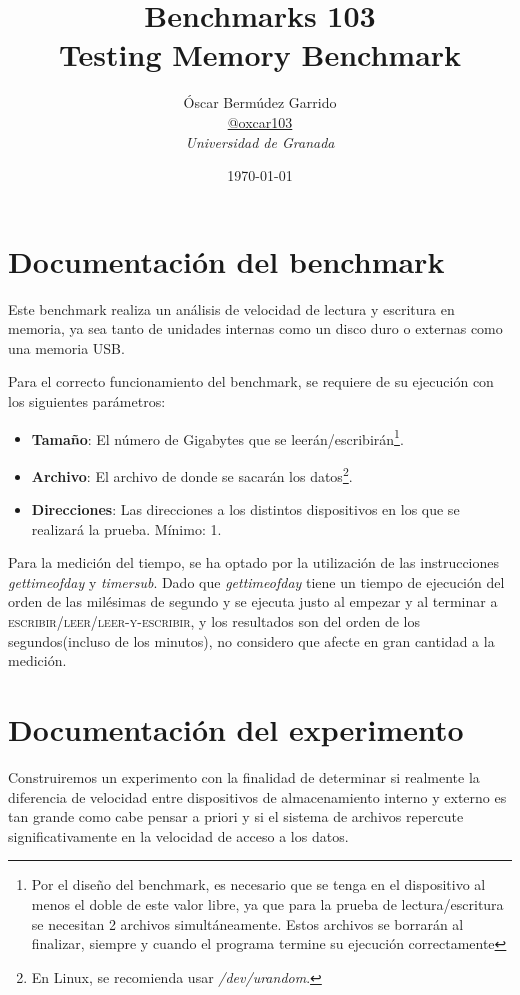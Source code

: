 \documentclass[paper=a4, fontsize=11pt]{scrartcl} %
\title{\textbf{Benchmarks 103}\\ %
Testing Memory Benchmark} %
\author{Óscar Bermúdez Garrido\\ \href{http://www.github.com/oxcar103}{@oxcar103} %
\\{\textit{Universidad de Granada}}} %
\date{\today} %
\numberwithin{equation}{section} %
\numberwithin{figure}{section} %
\numberwithin{table}{section} %
\begin{document}
\maketitle %

\tableofcontents

\pagebreak

	\section{Documentación del benchmark}
		Este benchmark realiza un análisis de velocidad de lectura y escritura en memoria, ya sea
		tanto de unidades internas como un disco duro o externas como una memoria USB.
		
		Para el correcto funcionamiento del benchmark, se requiere de su ejecución con los siguientes
		parámetros:
		
		\begin{itemize}
			\item \textbf{Tamaño}: El número de Gigabytes que se leerán/escribirán\footnote{Por el
			diseño del benchmark, es necesario que se tenga en el dispositivo al menos el doble de
			este valor libre, ya que para la prueba de lectura/escritura se necesitan 2 archivos
			simultáneamente. Estos archivos se borrarán al finalizar, siempre y cuando el programa
			termine su ejecución correctamente}.
			
			\item \textbf{Archivo}: El archivo de donde se sacarán los datos\footnote{En Linux, se
			recomienda usar \textit{/dev/urandom}.}.
			
			\item \textbf{Direcciones}: Las direcciones a los distintos dispositivos en los que se
			realizará la prueba. Mínimo: 1.
		\end{itemize}
		
		Para la medición del tiempo, se ha optado por la utilización de las instrucciones
		\textit{gettimeofday} y \textit{timersub}. Dado que \textit{gettimeofday} tiene un tiempo
		de ejecución del orden de las milésimas de segundo y se ejecuta justo al empezar y al
		terminar a \textsc{escribir}/\textsc{leer}/\textsc{leer-y-escribir}, y los resultados son
		del orden de los segundos(incluso de los minutos), no considero que afecte en gran cantidad
		a la medición.
		
	\section{Documentación del experimento}
		Construiremos un experimento con la finalidad de determinar si realmente la diferencia de
		velocidad entre dispositivos de almacenamiento interno y externo es tan grande como cabe
		pensar a priori y si el sistema de archivos repercute significativamente en la velocidad
		de acceso a los datos.
		
\end{document}

